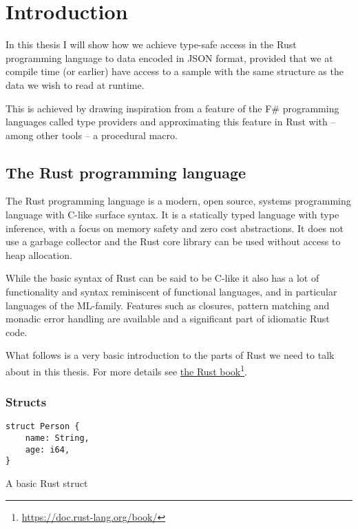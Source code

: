
\chapter{Introduction}

In this thesis I will show how we achieve type-safe access in the Rust programming language to data encoded in JSON format, provided that we at compile time (or earlier) have access to a sample with the same structure as the data we wish to read at runtime.

This is achieved by drawing inspiration from a feature of the F\# programming languages called type providers and approximating this feature in Rust with -- among other tools -- a procedural macro.

\section{The Rust programming language}

The Rust programming language is a modern, open source, systems programming language with C-like surface syntax. It is a statically typed language with type inference, with a focus on memory safety and zero cost abstractions. It does not use a garbage collector and the Rust core library can be used without access to heap allocation.

While the basic syntax of Rust can be said to be C-like it also has a lot of functionality and syntax reminiscent of functional languages, and in particular languages of the ML-family. Features such as closures, pattern matching and monadic error handling are available and a significant part of idiomatic Rust code.

What follows is a very basic introduction to the parts of Rust we need to talk about in this thesis. For more details see \href{https://doc.rust-lang.org/book/}{the Rust book}\footnote{\url{https://doc.rust-lang.org/book/}}.

\subsection{Structs}

\begin{listing}[ht!]
\begin{verbatim}
struct Person {
    name: String,
    age: i64,
}
\end{verbatim}
\caption{A basic Rust struct}
\label{lst:struct}
\end{listing}

